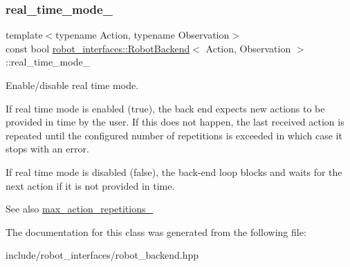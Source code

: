\subsubsection{\texorpdfstring{real\+\_\+time\+\_\+mode\+\_\+}{real\_time\_mode\_}}
{\footnotesize\ttfamily template$<$typename Action, typename Observation$>$ \\
const bool \hyperlink{classrobot__interfaces_1_1RobotBackend}{robot\+\_\+interfaces\+::\+Robot\+Backend}$<$ Action, Observation $>$\+::real\+\_\+time\+\_\+mode\+\_\+\hspace{0.3cm}{\ttfamily [private]}}



Enable/disable real time mode. 

If real time mode is enabled (true), the back end expects new actions to be provided in time by the user. If this does not happen, the last received action is repeated until the configured number of repetitions is exceeded in which case it stops with an error.

If real time mode is disabled (false), the back-\/end loop blocks and waits for the next action if it is not provided in time.

\begin{DoxySeeAlso}{See also}
\hyperlink{classrobot__interfaces_1_1RobotBackend_ae40ecdc44212f79f96d63a84f7b8a6e8}{max\+\_\+action\+\_\+repetitions\+\_\+} 
\end{DoxySeeAlso}


The documentation for this class was generated from the following file\+:\begin{DoxyCompactItemize}
\item 
include/robot\+\_\+interfaces/robot\+\_\+backend.\+hpp\end{DoxyCompactItemize}
